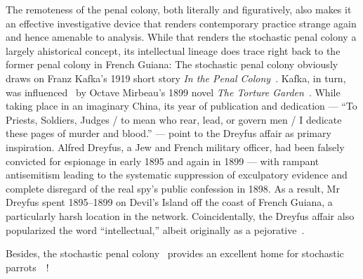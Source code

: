 The remoteness of the penal colony, both literally and figuratively, also makes
it an effective investigative device that renders contemporary practice strange
again and hence amenable to analysis. While that renders the stochastic penal
colony a largely ahistorical concept, its intellectual lineage does trace right
back to the former penal colony in French Guiana: The stochastic penal colony
obviously draws on Franz Kafka's 1919 short story \emph{In the Penal
Colony}~\cite{Kafka1995}. Kafka, in turn, was influenced~\cite{Robertson2017} by
Octave Mirbeau's 1899 novel \emph{The Torture Garden}~\cite{Mirbeau2008}. While
taking place in an imaginary China, its year of publication and dedication ---
``To Priests, Soldiers, Judges / to mean who rear, lead, or govern men / I
dedicate these pages of murder and blood.'' --- point to the Dreyfus affair as
primary inspiration. Alfred Dreyfus, a Jew and French military officer, had been
falsely convicted for espionage in early 1895 and again in 1899 --- with rampant
antisemitism leading to the systematic suppression of exculpatory evidence and
complete disregard of the real spy's public confession in 1898. As a result, Mr
Dreyfus spent 1895--1899 on Devil's Island off the coast of French Guiana, a
particularly harsh location in the network. Coincidentally, the Dreyfus affair
also popularized the word ``intellectual,'' albeit originally as a
pejorative~\cite{Drake2005,IntellectualsAndTheMediaInFrance2021}.

Besides, the stochastic penal colony~ provides an excellent
home for stochastic parrots~~\cite{BenderGebruea2021}!
